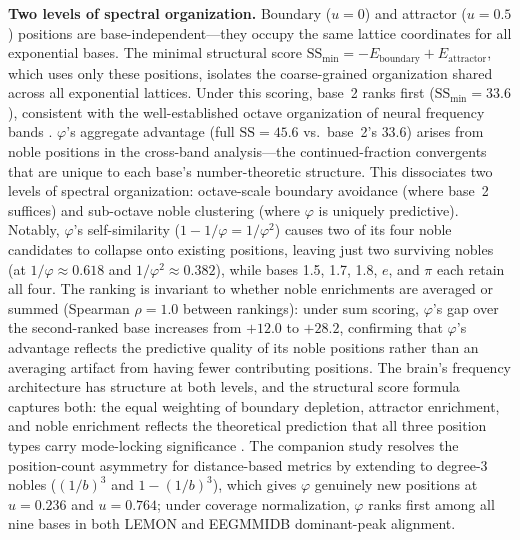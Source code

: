 \documentclass[11pt,a4paper]{article}
\newcommand{\phisym}{\varphi}
\begin{document}
\textbf{Two levels of spectral organization.} Boundary ($u = 0$) and attractor ($u = 0.5$) positions are base-independent---they occupy the same lattice coordinates for all exponential bases. The minimal structural score $\text{SS}_{\min} = -E_{\text{boundary}} + E_{\text{attractor}}$, which uses only these positions, isolates the coarse-grained organization shared across all exponential lattices. Under this scoring, base~2 ranks first ($\text{SS}_{\min} = 33.6$), consistent with the well-established octave organization of neural frequency bands \parencite{buzsaki2004neuronal}. $\phisym$'s aggregate advantage (full $\text{SS} = 45.6$ vs.\ base~2's $33.6$) arises from noble positions in the cross-band analysis---the continued-fraction convergents that are unique to each base's number-theoretic structure. This dissociates two levels of spectral organization: octave-scale boundary avoidance (where base~2 suffices) and sub-octave noble clustering (where $\phisym$ is uniquely predictive). Notably, $\phisym$'s self-similarity ($1 - 1/\phisym = 1/\phisym^2$) causes two of its four noble candidates to collapse onto existing positions, leaving just two surviving nobles (at $1/\phisym \approx 0.618$ and $1/\phisym^2 \approx 0.382$), while bases 1.5, 1.7, 1.8, $e$, and $\pi$ each retain all four. The ranking is invariant to whether noble enrichments are averaged or summed (Spearman $\rho = 1.0$ between rankings): under sum scoring, $\phisym$'s gap over the second-ranked base increases from $+12.0$ to $+28.2$, confirming that $\phisym$'s advantage reflects the predictive quality of its noble positions rather than an averaging artifact from having fewer contributing positions. The brain's frequency architecture has structure at both levels, and the structural score formula captures both: the equal weighting of boundary depletion, attractor enrichment, and noble enrichment reflects the theoretical prediction that all three position types carry mode-locking significance \parencite{pletzer2010golden}. The companion study resolves the position-count asymmetry for distance-based metrics by extending to degree-3 nobles ($(1/b)^3$ and $1 - (1/b)^3$), which gives $\phisym$ genuinely new positions at $u = 0.236$ and $u = 0.764$; under coverage normalization, $\phisym$ ranks first among all nine bases in both LEMON and EEGMMIDB dominant-peak alignment.
\end{document}
